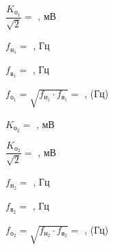 \begin{enumerate}
\begin{multicols}{3}
$ \dfrac{K_{\text{о}_1}}{\sqrt{2}} = $ \hspace{8mm} , мВ

$ f_{\text{н}_1} = $ \hspace{8mm} , Гц

$ f_{\text{в}_1} = $ \hspace{8mm} , Гц

$ f_{\text{о}_1} = \sqrt{f_{\text{н}_1} \cdot f_{\text{в}_1}} = $ \hspace{8mm} , (Гц)

\end{multicols}

\vspace{4mm}

\begin{multicols}{3}

$ K_{\text{о}_2} = $ \hspace{8mm} , мВ

$ \dfrac{K_{\text{о}_2}}{\sqrt{2}} = $ \hspace{8mm} , мВ

$ f_{\text{н}_2} = $ \hspace{8mm} , Гц

$ f_{\text{в}_2} = $ \hspace{8mm} , Гц

$ f_{\text{о}_2} = \sqrt{f_{\text{н}_2} \cdot f_{\text{в}_2}} = $ \hspace{8mm} , (Гц)

\end{multicols}


\end{enumerate}
